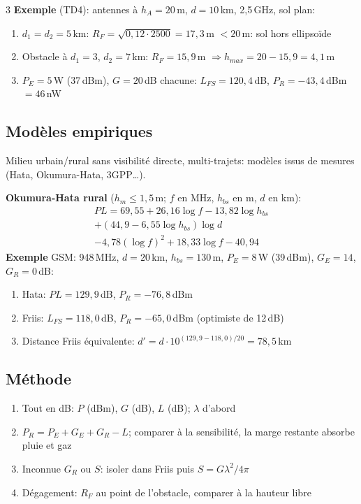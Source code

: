 \documentclass[12pt, a4paper]{article}
\begin{document}
\begin{multicols*}{3}
	\colbreak
	\textbf{Exemple} (TD4): antennes à $h_A=20$\,m, $d=10$\,km, 2,5\,GHz, sol plan:
	\begin{enumerate}[\roman*.]
		\item $d_1=d_2=5$\,km: $R_F=\sqrt{0{,}12\cdot2500}=17{,}3$\,m $<20$\,m: sol hors ellipsoïde
		\item Obstacle à $d_1=3$, $d_2=7$\,km: $R_F=15{,}9$\,m $\Rightarrow h_{max}=20-15{,}9=4{,}1$\,m
		\item $P_E=5$\,W (37\,dBm), $G=20$\,dB chacune: $L_{FS}=120{,}4$\,dB, $P_R=-43{,}4$\,dBm $=46$\,nW
	\end{enumerate}

	\subsection{Modèles empiriques}
	Milieu urbain/rural sans visibilité directe, multi-trajets: modèles issus de mesures (Hata, Okumura-Hata, 3GPP\dots).

	\textbf{Okumura-Hata rural} ($h_m\leq1{,}5$\,m; $f$ en MHz, $h_{bs}$ en m, $d$ en km):
	\begin{gather*}
		PL=69{,}55+26{,}16\log f-13{,}82\log h_{bs}\\
		+(44{,}9-6{,}55\log h_{bs})\log d\\
		-4{,}78(\log f)^2+18{,}33\log f-40{,}94
	\end{gather*}
	\textbf{Exemple} GSM: 948\,MHz, $d=20$\,km, $h_{bs}=130$\,m, $P_E=8$\,W (39\,dBm), $G_E=14$, $G_R=0$\,dB:
	\begin{enumerate}[\roman*.]
		\item Hata: $PL=129{,}9$\,dB, $P_R=-76{,}8$\,dBm
		\item Friis: $L_{FS}=118{,}0$\,dB, $P_R=-65{,}0$\,dBm (optimiste de 12\,dB)
		\item Distance Friis équivalente: $d'=d\cdot10^{(129{,}9-118{,}0)/20}=78{,}5$\,km
	\end{enumerate}

	\subsection{Méthode}
	\begin{enumerate}[\roman*.]
		\item Tout en dB: $P$ (dBm), $G$ (dB), $L$ (dB); $\lambda$ d'abord
		\item $P_R=P_E+G_E+G_R-L$; comparer à la sensibilité, la marge restante absorbe pluie et gaz
		\item Inconnue $G_R$ ou $S$: isoler dans Friis puis $S=G\lambda^2/4\pi$
		\item Dégagement: $R_F$ au point de l'obstacle, comparer à la hauteur libre
	\end{enumerate}


\end{multicols*}
\end{document}
